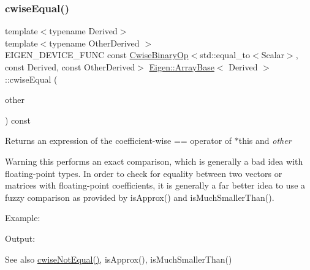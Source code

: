 \subsubsection{\texorpdfstring{cwiseEqual()}{cwiseEqual()}\hspace{0.1cm}{\footnotesize\ttfamily [1/2]}}
{\footnotesize\ttfamily template$<$typename Derived$>$ \\
template$<$typename Other\+Derived $>$ \\
E\+I\+G\+E\+N\+\_\+\+D\+E\+V\+I\+C\+E\+\_\+\+F\+U\+NC const \mbox{\hyperlink{class_eigen_1_1_cwise_binary_op}{Cwise\+Binary\+Op}}$<$std\+::equal\+\_\+to$<$Scalar$>$, const Derived, const Other\+Derived$>$ \mbox{\hyperlink{class_eigen_1_1_array_base}{Eigen\+::\+Array\+Base}}$<$ Derived $>$\+::cwise\+Equal (\begin{DoxyParamCaption}\item[{const E\+I\+G\+E\+N\+\_\+\+C\+U\+R\+R\+E\+N\+T\+\_\+\+S\+T\+O\+R\+A\+G\+E\+\_\+\+B\+A\+S\+E\+\_\+\+C\+L\+A\+SS$<$ Other\+Derived $>$ \&}]{other }\end{DoxyParamCaption}) const\hspace{0.3cm}{\ttfamily [inline]}}

\begin{DoxyReturn}{Returns}
an expression of the coefficient-\/wise == operator of $\ast$this and {\itshape other} 
\end{DoxyReturn}
\begin{DoxyWarning}{Warning}
this performs an exact comparison, which is generally a bad idea with floating-\/point types. In order to check for equality between two vectors or matrices with floating-\/point coefficients, it is generally a far better idea to use a fuzzy comparison as provided by is\+Approx() and is\+Much\+Smaller\+Than().
\end{DoxyWarning}
Example\+: 
\begin{DoxyCodeInclude}{0}
\end{DoxyCodeInclude}
 Output\+: 
\begin{DoxyVerbInclude}
\end{DoxyVerbInclude}


\begin{DoxySeeAlso}{See also}
\mbox{\hyperlink{class_eigen_1_1_array_base_a69fb89b5cc84d7043cce9df0f371ed10}{cwise\+Not\+Equal()}}, is\+Approx(), is\+Much\+Smaller\+Than() 
\end{DoxySeeAlso}
\mbox{\label{class_eigen_1_1_array_base_a27bfdb32677ef8e25b1d2302a25ea504}} 
